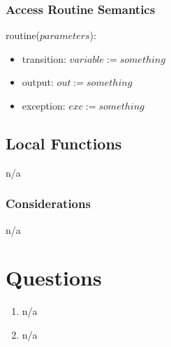 \documentclass[12pt]{article}
\begin{document}
\subsubsection* {Access Routine Semantics}
\noindent routine($parameters$):
\begin{itemize}
    \item transition: $variable := something$
    \item output: $out := something$
    \item exception: $exc := something$
\end{itemize}


\subsection*{Local Functions}
n/a


\subsubsection* {Considerations}
n/a



\newpage
\section* {Questions}
\begin{enumerate}
    \item n/a
    \item n/a
\end{enumerate}
\end{document}
